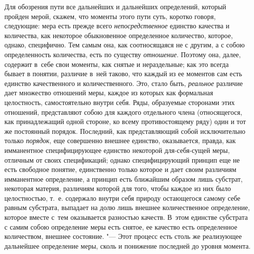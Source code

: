 Для обозрения пути все дальнейших и дальнейших определений, который пройден
мерой, скажем, что моменты этого пути суть, коротко говоря, следующие: мера
есть прежде всего {\em непосредственное} единство качества и количества, как
некоторое обыкновенное определенное количество, которое, однако, специфично.
Тем самым она, как соотносящаяся не с другим, а с собою определенность
количества, есть по существу {\em отношение}. Поэтому она, далее, содержит
в~себе свои моменты, как снятые и нераздельные; как это всегда бывает
в понятии, различие в~ней таково, что каждый из ее моментов сам есть единство
качественного и количественного. Это, стало быть, {\em реальное} различие дает
множество отношений меры, каждое из которых как формальная целостность,
самостоятельно внутри себя. Ряды, образуемые сторонами этих отношений,
представляют собою для каждого отдельного члена (относящегося, как
принадлежащий одной стороне, ко всему противостоящему ряду) один и тот же
постоянный порядок. Последний, как представляющий собой исключительно только
{\em порядок}, еще совершенно внешнее единство, оказывается, правда, как
имманентное специфицирующее единство некоторой для-себя-сущей меры, отличным
от своих спецификаций; однако специфицирующий принцип еще не есть свободное
понятие, единственно только которое и дает своим различиям имманентное
определение, а принцип есть ближайшим образом лишь субстрат, некоторая материя,
различиям которой для того, чтобы каждое из них было целостностью, т.~е.
содержало внутри себя природу остающегося самому себе равным субстрата,
выпадает на долю лишь внешнее количественное определение, которое вместе
с~тем оказывается разностью качеств. В~этом единстве субстрата с самим собою
определение меры есть снятое, ее качество есть определенное количеством,
внешнее состояние. "--- Этот процесс есть столь же реализующее дальнейшее
определение меры, сколь и понижение последней до уровня момента.
